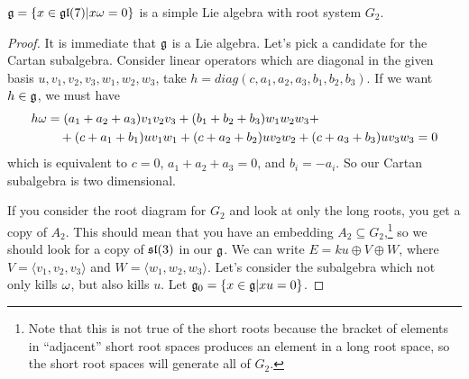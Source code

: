  \begin{claim}
   $\g = \{x\in \gl(7)|x\w=0\}$ is a simple Lie algebra with root system $G_2$.
 \end{claim}
 \begin{proof}
   It is immediate that $\g$ is a Lie algebra.
   Let's pick a candidate for the Cartan subalgebra. Consider linear operators which
   are diagonal in the given basis $u,v_1,v_2,v_3,w_1,w_2,w_3$,
   take $h = diag(c,a_1,a_2,a_3,b_1,b_2,b_3)$. If we want $h\in \g$, we must have
   \begin{align*}
    h\w &= (a_1+a_2+a_3)v_1v_2v_3 + (b_1+b_2+b_3)w_1w_2w_3 + \\
        & \quad + (c+a_1+b_1)uv_1w_1 + (c+a_2+b_2)uv_2w_2 + (c+a_3+b_3)uv_3w_3 = 0
   \end{align*}
   which is equivalent to $c=0$, $a_1+a_2+a_3=0$,
   and $b_i=-a_i$. So our Cartan subalgebra is two dimensional.

   If you consider the root diagram for $G_2$ and look at only the long roots, you get
   a copy of $A_2$. This should mean that you have an embedding $A_2\subseteq
   G_2$,\footnote{Note that this is not true of the short roots because the bracket of
   elements in ``adjacent'' short root spaces produces an element in a long root
   space, so the short root spaces will generate all of $G_2$.} so we should look for
   a copy of $\sl(3)$ in our $\g$. We can write $E = ku\oplus V\oplus W$, where
   $V=\langle v_1,v_2,v_3\rangle$ and $W=\langle w_1,w_2,w_3\rangle$. Let's consider
   the subalgebra which not only kills $\w$, but also kills $u$. Let $\g_0 = \{x\in
   \g| xu=0\}$.



\end{proof}
